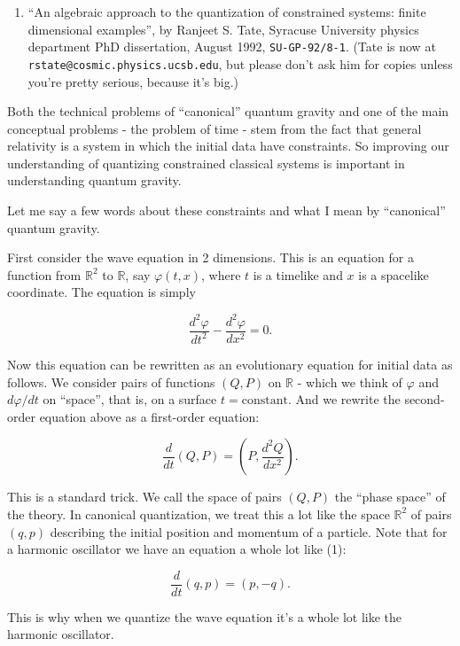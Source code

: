 \documentclass{article}
\def\tightlist{}
\begin{document}
\begin{enumerate}
\def\labelenumi{\arabic{enumi})}
\setcounter{enumi}{1}
\tightlist
\item
  ``An algebraic approach to the quantization of constrained systems:
  finite dimensional examples'', by Ranjeet S. Tate, Syracuse University
  physics department PhD dissertation, August 1992,
  \texttt{SU-GP-92/8-1}. (Tate is now at
  \texttt{rstate@cosmic.physics.ucsb.edu}, but please don't ask him for
  copies unless you're pretty serious, because it's big.)
\end{enumerate}

Both the technical problems of ``canonical'' quantum gravity and one of
the main conceptual problems - the problem of time - stem from the fact
that general relativity is a system in which the initial data have
constraints. So improving our understanding of quantizing constrained
classical systems is important in understanding quantum gravity.

Let me say a few words about these constraints and what I mean by
``canonical'' quantum gravity.

First consider the wave equation in 2 dimensions. This is an equation
for a function from \(\mathbb{R}^2\) to \(\mathbb{R}\), say
\(\varphi(t,x)\), where \(t\) is a timelike and \(x\) is a spacelike
coordinate. The equation is simply

\[\frac{d^2\varphi}{dt^2} - \frac{d^2\varphi}{dx^2} = 0.\]

Now this equation can be rewritten as an evolutionary equation for
initial data as follows. We consider pairs of functions \((Q,P)\) on
\(\mathbb{R}\) - which we think of \(\varphi\) and \(d\varphi/dt\) on
``space'', that is, on a surface \(t = \text{constant}\). And we rewrite
the second-order equation above as a first-order equation:

\[\frac{d}{dt}(Q,P) = \left(P,\frac{d^2Q}{dx^2}\right).\tag{1}\]

This is a standard trick. We call the space of pairs \((Q,P)\) the
``phase space'' of the theory. In canonical quantization, we treat this
a lot like the space \(\mathbb{R}^2\) of pairs \((q,p)\) describing the
initial position and momentum of a particle. Note that for a harmonic
oscillator we have an equation a whole lot like (1):

\[\frac{d}{dt}(q,p) = (p,-q).\]

This is why when we quantize the wave equation it's a whole lot like the
harmonic oscillator.
\end{document}
